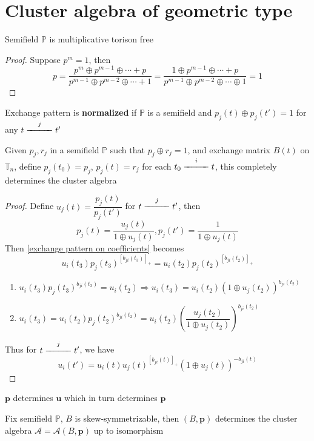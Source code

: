 \documentclass[main]{subfiles}
\begin{document}
\section{Cluster algebra of geometric type}

\begin{lemma}\label{Semifield is multiplicative torison free}
Semifield $\mathbb P$ is multiplicative torison free
\end{lemma}

\begin{proof}
Suppose $p^m=1$, then
\[p=\frac{p^m\oplus p^{m-1}\oplus \cdots+p}{p^{m-1}\oplus p^{m-2}\oplus \cdots+1}=\frac{1\oplus p^{m-1}\oplus \cdots+p}{p^{m-1}\oplus p^{m-2}\oplus \cdots\oplus 1}=1\]
\end{proof}

\begin{definition}
Exchange pattern is \textbf{normalized} if $\mathbb P$ is a semifield and $p_j(t)\oplus p_j(t')=1$ for any $t\xedge jt'$
\end{definition}

\begin{proposition}\label{Normalized exchange pattern determines the cluster algebra}
Given $p_j,r_j$ in a semifield $\mathbb P$ such that $p_j\oplus r_j=1$, and exchange matrix $B(t)$ on $\mathbb T_n$, define $p_j(t_0)=p_j$, $p_j(t)=r_j$ for each $t_0\xedge it$, this completely determines the cluster algebra
\end{proposition}

\begin{proof}
Define $u_j(t)=\dfrac{p_j(t)}{p_j(t')}$ for $t\xedge jt'$, then
\[p_j(t)=\frac{u_j(t)}{1\oplus u_j(t)},p_j(t')=\frac{1}{1\oplus u_j(t)}\]
Then \eqref{exchange pattern on coefficients} becomes
\[u_i(t_3)p_j(t_3)^{[b_{ji}(t_3)]_+}=u_i(t_2)p_j(t_2)^{[b_{ji}(t_2)]_+}\]
\begin{enumerate}[leftmargin=*,label=Case \arabic*:]
\item $u_i(t_3)p_j(t_3)^{b_{ji}(t_3)}=u_i(t_2)\Rightarrow u_i(t_3)=u_i(t_2)(1\oplus u_j(t_2))^{b_{ji}(t_2)}$
\item $u_i(t_3)=u_i(t_2)p_j(t_2)^{b_{ji}(t_2)}=u_i(t_2)\left(\dfrac{u_j(t_2)}{1\oplus u_j(t_2)}\right)^{b_{ji}(t_2)}$
\end{enumerate}
Thus for $t\xedge jt'$, we have
\[u_i(t')=u_i(t)u_j(t)^{[b_{ji}(t)]_+}(1\oplus u_j(t))^{-b_{ji}(t)}\]
\end{proof}

\begin{remark}
$\mathbf p$ determines $\mathbf u$ which in turn determines $\mathbf p$ \par
Fix semifield $\mathbb P$, $B$ is skew-symmetrizable, then $(B,\mathbf p)$ determines the cluster algebra $\mathcal A=\mathcal A(B,\mathbf p)$ up to isomorphism
\end{remark}
\end{document}
